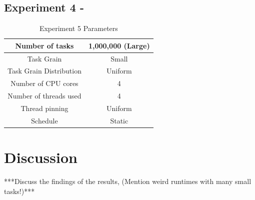 \subsection{Experiment 4 - }

\begin{table}
\centering
	\begin{tabular}{|c|c|}
		\hline
		Number of tasks & 1,000,000 (Large) \\
		\hline
		Task Grain & Small \\
		\hline
		Task Grain Distribution & Uniform \\
		\hline
		Number of CPU cores & 4 \\
		\hline
		Number of threads used & 4 \\
		\hline
		Thread pinning & Uniform \\
		\hline
		Schedule & Static \\
		\hline
	\end{tabular}
\caption{Experiment 5 Parameters}
\label{table:ex5_parameters}
\end{table}



\section{Discussion}

 ***Discuss the findings of the results, (Mention weird runtimes with many small tasks!)***